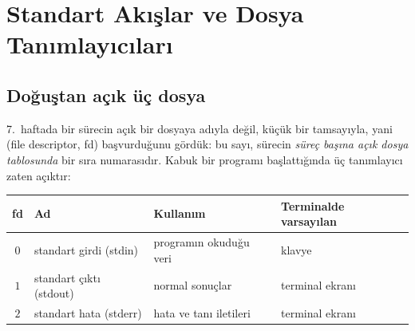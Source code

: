 \section{Standart Akışlar ve Dosya Tanımlayıcıları}
\label{sec:streams}

\subsection{Doğuştan açık üç dosya}

7.~haftada bir sürecin açık bir dosyaya adıyla değil, küçük bir tamsayıyla, yani  (file descriptor, fd) başvurduğunu gördük: bu sayı, sürecin \emph{süreç başına açık dosya tablosunda} bir sıra numarasıdır. Kabuk bir programı başlattığında üç tanımlayıcı zaten açıktır:

\begin{center}
\renewcommand{\arraystretch}{1.25}
\begin{tabular}{@{}clll@{}}
\toprule
\textbf{fd} & \textbf{Ad} & \textbf{Kullanım} & \textbf{Terminalde varsayılan}\\
\midrule
$0$ & standart girdi (stdin) & programın okuduğu veri & klavye\\
$1$ & standart çıktı (stdout) & normal sonuçlar & terminal ekranı\\
$2$ & standart hata (stderr) & hata ve tanı iletileri & terminal ekranı\\
\bottomrule
\end{tabular}
\end{center}

